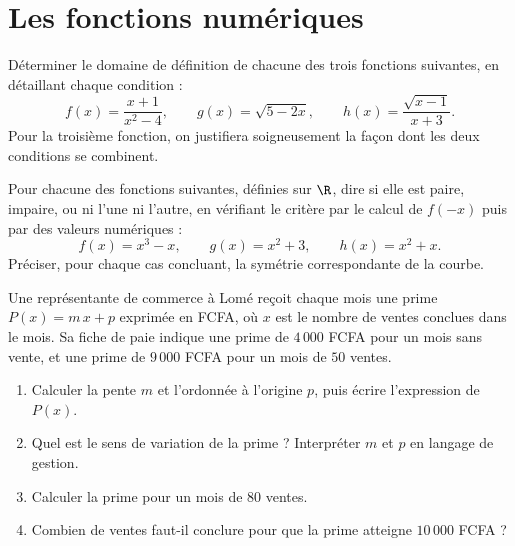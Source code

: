 \clearpage
\chapter{Les fonctions numériques}

\begin{exercice}
Déterminer le domaine de définition de chacune des trois fonctions suivantes, en détaillant chaque condition :
\[
f(x) = \frac{x+1}{x^{2} - 4}, \qquad g(x) = \sqrt{5 - 2x}, \qquad h(x) = \frac{\sqrt{x-1}}{x + 3}.
\]
Pour la troisième fonction, on justifiera soigneusement la façon dont les deux conditions se combinent.
\end{exercice}

\begin{exercice}
Pour chacune des fonctions suivantes, définies sur $\R$, dire si elle est paire, impaire, ou ni l'une ni l'autre, en vérifiant le critère par le calcul de $f(-x)$ puis par des valeurs numériques :
\[
f(x) = x^{3} - x, \qquad g(x) = x^{2} + 3, \qquad h(x) = x^{2} + x.
\]
Préciser, pour chaque cas concluant, la symétrie correspondante de la courbe.
\end{exercice}

\begin{exercice}
Une représentante de commerce à Lomé reçoit chaque mois une prime $P(x) = m\,x + p$ exprimée en FCFA, où $x$ est le nombre de ventes conclues dans le mois. Sa fiche de paie indique une prime de $4\,000$ FCFA pour un mois sans vente, et une prime de $9\,000$ FCFA pour un mois de $50$ ventes.
\begin{enumerate}
\item Calculer la pente $m$ et l'ordonnée à l'origine $p$, puis écrire l'expression de $P(x)$.
\item Quel est le sens de variation de la prime ? Interpréter $m$ et $p$ en langage de gestion.
\item Calculer la prime pour un mois de $80$ ventes.
\item Combien de ventes faut-il conclure pour que la prime atteigne $10\,000$ FCFA ?
\end{enumerate}
\end{exercice}

